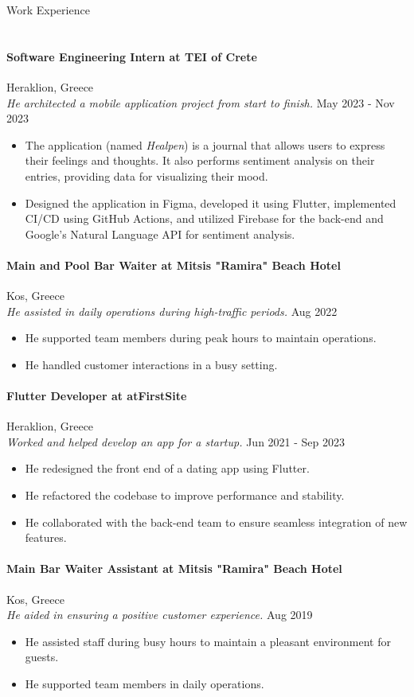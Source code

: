 \documentclass[a4paper, 11pt]{article}
\newcommand{\lineunder} {
    \vspace*{-8pt} \\
    \hspace*{-18pt} \hrulefill \\
}
\newcommand{\header} [1] {
    \vspace*{6mm}
    {\hspace*{-18pt}\vspace*{6pt} #1}
    \vspace*{-6pt} \lineunder
}
\newcommand{\workexperience}[5]{ %
    \paragraph{#1} \hfill #2 \\ %
    \textit{#3} \hfill #4 \\ %
    #5 %
}
\begin{document}
\header{Work Experience}
\workexperience
{Software Engineering Intern at TEI of Crete}
{Heraklion, Greece}
{He architected a mobile application project from start to finish.}
{May 2023 - Nov 2023}
{
    \begin{itemize} \itemsep 1pt
        \item The application (named \textit{Healpen}) is a journal that allows users to express their feelings and thoughts. It also performs sentiment analysis on their entries, providing data for visualizing their mood.
        \item Designed the application in Figma, developed it using Flutter, implemented CI/CD using GitHub Actions, and utilized Firebase for the back-end and Google's Natural Language API for sentiment analysis.
    \end{itemize}
}
\workexperience
{Main and Pool Bar Waiter at Mitsis "Ramira" Beach Hotel}
{Kos, Greece}
{He assisted in daily operations during high-traffic periods.}
{Aug 2022}
{
    \begin{itemize} \itemsep 1pt
        \item He supported team members during peak hours to maintain operations.
        \item He handled customer interactions in a busy setting.
    \end{itemize}
}
\workexperience
{Flutter Developer at atFirstSite}
{Heraklion, Greece}
{Worked and helped develop an app for a startup.}
{Jun 2021 - Sep 2023}
{
    \begin{itemize} \itemsep 1pt
        \item He redesigned the front end of a dating app using Flutter.
        \item He refactored the codebase to improve performance and stability.
        \item He collaborated with the back-end team to ensure seamless integration of new features.
    \end{itemize}
}
\workexperience
{Main Bar Waiter Assistant at Mitsis "Ramira" Beach Hotel}
{Kos, Greece}
{He aided in ensuring a positive customer experience.}
{Aug 2019}
{
    \begin{itemize} \itemsep 1pt
        \item He assisted staff during busy hours to maintain a pleasant environment for guests.
        \item He supported team members in daily operations.
    \end{itemize}
}
\end{document}
